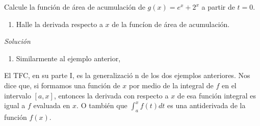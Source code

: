 \begin{ejemplo}
\textnormal{Calcule la función de área de acumulación de \textit{$g\left(x\right) =e^{x}+2^{x}$} a partir de \textit{$t=0.$}}
\begin{enumerate}[leftmargin=1.2em,   itemindent=0pt,       labelwidth=\labelwidth,labelsep=0.5em,]
	

\item \textnormal{Halle la derivada respecto a \textit{$x$} de la funcíon de área de acumulación.}
\end{enumerate}
\end{ejemplo}


\textit{Solución}


\begin{enumerate}[leftmargin=1.2em,   itemindent=0pt,       labelwidth=\labelwidth,labelsep=0.5em,]
	
\item Similarmente al ejemplo anterior,






\end{enumerate}


El TFC, en su parte I, es la generalizació%
n de los dos ejemplos anteriores. Nos dice que, si formamos una función de $x$ por medio de la integral de $f$ en el intervalo {\small $[a,x]$}, entonces la derivada con respecto a $x$ de esa función integral es igual a $f$ evaluada en $x$. O también que {\footnotesize $\displaystyle\int_{a}^{x}f(t)dt$} es una antiderivada de la función $f(x)$.

